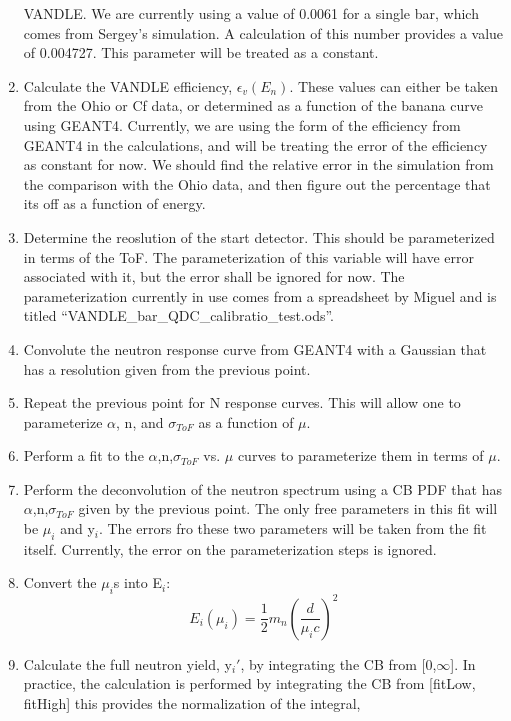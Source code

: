 \begin{enumerate}
  VANDLE. We are currently using a value of 0.0061 for a single bar, 
  which comes from Sergey's simulation. A calculation of this number 
  provides a value of 0.004727. This parameter will be treated as a constant.
\item Calculate the VANDLE efficiency, $\epsilon_{v}(E_n)$. These values can 
  either be taken from the Ohio or Cf data, or determined as a function of the 
  banana curve using GEANT4. Currently, we are using the form of the 
  efficiency from GEANT4 in the calculations, and will be treating the error of 
  the efficiency as constant for now. We should find the relative error in the 
  simulation from the comparison with the Ohio data, and then figure out the 
  percentage that its off as a function of energy.
\item Determine the reoslution of the start detector. This should be 
  parameterized in terms of the ToF. The parameterization of this variable 
  will have error associated with it, but the error shall be ignored for now. 
  The parameterization currently in use comes from a spreadsheet by Miguel and 
  is titled ``VANDLE\_bar\_QDC\_calibratio\_test.ods''.
\item Convolute the neutron response curve from GEANT4 with a Gaussian that has 
  a resolution given from the previous point.
\item Repeat the previous point for N response curves. This will allow one to 
  parameterize $\alpha$, n, and $\sigma_{ToF}$ as a function of $\mu$.
\item Perform a fit to the $\alpha$,n,$\sigma_{ToF}$ vs. $\mu$ curves to 
  parameterize them in terms of $\mu$.
\item Perform the deconvolution of the neutron spectrum using a CB PDF that 
  has $\alpha$,n,$\sigma_{ToF}$ given by the previous point. The only free 
  parameters in this fit will be $\mu_i$ and y$_i$. The errors fro these two 
  parameters will be taken from the fit itself. Currently, the error on 
  the parameterization steps is ignored.
\item Convert the $\mu_i$s into E$_i$:
  \begin{equation}
    E_i(\mu_i) = \frac{1}{2}m_n \left(\frac{d}{\mu_ic}\right)^2
    \label{eqn:kinE}
  \end{equation}
\item Calculate the full neutron yield, y$_i'$, by integrating the CB from 
  [0,$\infty$]. In practice, the calculation is performed by integrating 
  the CB from [fitLow, fitHigh] this provides the normalization of the integral,

\end{enumerate}
